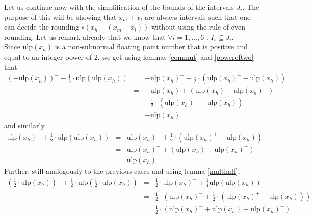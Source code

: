 \documentclass[a4paper,10pt,twoside]{article}
\newenvironment{proof}[1][Proof]{\begin{trivlist}
\item[\hskip \labelsep {\bfseries #1}]}{\end{trivlist}}
\newcommand{\hi}{\ensuremath{\mathit{h}}}
\newcommand{\mi}{\ensuremath{\mathit{m}}}
\newcommand{\lo}{\ensuremath{\mathit{l}}}
\newcommand{\mUlp}{\ensuremath{\mathrm{ulp}}}
\begin{document}
\begin{proof}
Let us continue now with the simplification of the bounds of the intervals $J_i$. The purpose of this  
will be showing that $x_\mi + x_\lo$ are always intervals such that one can decide the rounding 
$\circ \left( x_\hi + \left( x_\mi + x_\lo \right) \right)$
without using the rule of even rounding. Let us remark already that we know that $\forall i=1,\dots,6 \mbox{ . } I_i \subseteq J_i$.\\
Since $\mUlp\left( x_\hi \right)$ is a non-subnormal floating point number that is positive and equal to an integer power
of $2$, we get using lemmas \ref{commut} and \ref{poweroftwo} that 
\begin{eqnarray*}
\left( - \mUlp\left( x_\hi \right)  \right)^- - \frac{1}{2} \cdot \mUlp\left(  \mUlp\left( x_\hi \right)  \right) & = & 
- \mUlp\left( x_\hi \right)^- - \frac{1}{2} \cdot \left(  \mUlp\left( x_\hi \right)^+ -  \mUlp\left( x_\hi \right)  \right) \\
& = & - \mUlp\left( x_\hi \right)  + \left(  \mUlp\left( x_\hi \right)  - \mUlp\left( x_\hi \right)^- \right) \\ & & - 
\frac{1}{2} \cdot \left(  \mUlp\left( x_\hi \right)^+ -  \mUlp\left( x_\hi \right)  \right) \\
& = & - \mUlp\left( x_\hi \right) 
\end{eqnarray*}
and similarly
\begin{eqnarray*}
 \mUlp\left( x_\hi \right)^- + \frac{1}{2} \cdot \mUlp\left(  \mUlp\left( x_\hi \right)  \right) & = &  
\mUlp\left( x_\hi \right)^- + \frac{1}{2} \cdot \left(  \mUlp\left( x_\hi \right)^+ -  \mUlp\left( x_\hi \right)  \right) \\
& = &  \mUlp\left( x_\hi \right)^- + \left(  \mUlp\left( x_\hi \right)  -  \mUlp\left( x_\hi \right)^- \right) \\ 
& = &  \mUlp\left( x_\hi \right) 
\end{eqnarray*}
Further, still analogously to the previous cases and using lemma \ref{multhalf},
\begin{eqnarray*}
\left( \frac{1}{2} \cdot  \mUlp\left( x_\hi \right)  \right)^- + \frac{1}{2} \cdot \mUlp\left( \frac{1}{2} \cdot  \mUlp\left( x_\hi \right)  \right) 
& = & 
\frac{1}{2} \cdot  \mUlp\left( x_\hi \right)^- + \frac{1}{4} \mUlp\left(  \mUlp\left( x_\hi \right)  \right) \\
& = & \frac{1}{2} \cdot \left(  \mUlp\left( x_\hi \right)^- + \frac{1}{2} \cdot \left(  \mUlp\left( x_\hi \right)^+ 
-  \mUlp\left( x_\hi \right)  \right) \right) \\
& = & \frac{1}{2} \cdot \left(  \mUlp\left( x_\hi \right)^- +  \mUlp\left( x_\hi \right)  -  \mUlp\left( x_\hi \right)^- \right) \\

\end{eqnarray*}
\end{proof}
\end{document}
